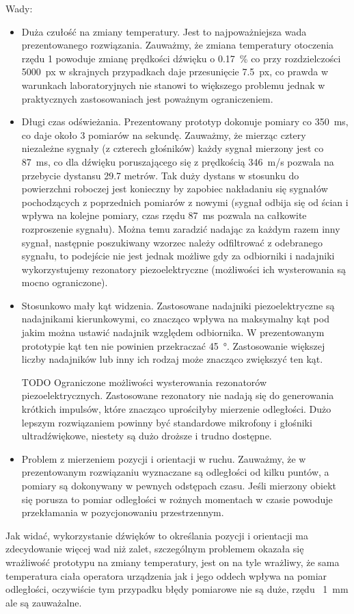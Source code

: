 Wady:
\begin{itemize}
 \item Duża czułość na zmiany temperatury. Jest to najpoważniejsza wada prezentowanego rozwiązania.
 Zauważmy, że zmiana temperatury otoczenia rzędu \SI{1}{\degC} powoduje zmianę prędkości dźwięku o \SI{0,17}{\%} 
 co przy rozdzielczości \SI{5000}{px} w skrajnych przypadkach daje przesunięcie \SI{7.5}{px},
 co prawda w warunkach laboratoryjnych nie stanowi to większego problemu jednak w praktycznych zastosowaniach
 jest poważnym ograniczeniem.
 
 \item Długi czas odświeżania. Prezentowany prototyp dokonuje pomiary co \SI{350}{ms}, co daje około 3 pomiarów 
 na sekundę. Zauważmy, że mierząc cztery niezależne sygnały (z czterech głośników) każdy sygnał mierzony jest co \SI{87}{ms},
 co dla dźwięku poruszającego się z prędkością \SI{346}{m/s} pozwala na przebycie dystansu 29.7 metrów.
 Tak duży dystans w stosunku do powierzchni roboczej jest konieczny by zapobiec nakładaniu się sygnałów pochodzących z poprzednich
 pomiarów z nowymi (sygnał odbija się od ścian i wpływa na kolejne pomiary, czas rzędu \SI{87}{ms} pozwala 
 na całkowite rozproszenie sygnału).
 Można temu zaradzić nadając za każdym razem inny sygnał, następnie poszukiwany wzorzec należy odfiltrować z odebranego
 sygnału, to podejście nie jest jednak możliwe gdy za odbiorniki i nadajniki wykorzystujemy rezonatory piezoelektryczne
 (możliwości ich wysterowania są mocno ograniczone).
 
 \item Stosunkowo mały kąt widzenia. Zastosowane nadajniki piezoelektryczne są nadajnikami kierunkowymi, co 
 znacząco wpływa na maksymalny kąt pod jakim można ustawić nadajnik względem odbiornika. W prezentowanym 
 prototypie kąt ten nie powinien przekraczać \SI{45}{\degree}. Zastosowanie większej liczby nadajników lub inny ich rodzaj
 może znacząco zwiększyć ten kąt.

 \item [TODO] Ograniczone możliwości wysterowania rezonatorów piezoelektrycznych. 
 Zastosowane rezonatory nie nadają się do generowania krótkich impulsów, które znacząco uprościłyby mierzenie odległości.
 Dużo lepszym rozwiązaniem powinny być standardowe mikrofony i głośniki ultradźwiękowe, niestety są dużo droższe 
 i trudno dostępne.
 
 \item Problem z mierzeniem pozycji i orientacji w ruchu. Zauważmy, że w prezentowanym rozwiązaniu wyznaczane są odległości od
 kilku puntów, a pomiary są dokonywany w pewnych odstępach czasu. Jeśli mierzony obiekt się porusza to pomiar odległości w rożnych
 momentach w czasie powoduje przekłamania w pozycjonowaniu przestrzennym.
 
\end{itemize}

Jak widać, wykorzystanie dźwięków to określania pozycji i orientacji ma zdecydowanie więcej wad niż zalet,
szczególnym problemem okazała się wrażliwość prototypu na zmiany temperatury, jest on na tyle wrażliwy, że 
sama temperatura ciała operatora urządzenia jak i jego oddech wpływa na pomiar odległości, oczywiście tym przypadku błędy pomiarowe
nie są duże, rzędu ~\SI{1}{mm} ale są zauważalne.
